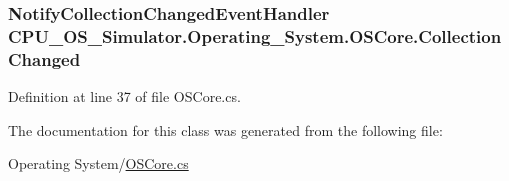 \subsubsection[{Collection\+Changed}]{\setlength{\rightskip}{0pt plus 5cm}Notify\+Collection\+Changed\+Event\+Handler C\+P\+U\+\_\+\+O\+S\+\_\+\+Simulator.\+Operating\+\_\+\+System.\+O\+S\+Core.\+Collection\+Changed}\label{class_c_p_u___o_s___simulator_1_1_operating___system_1_1_o_s_core_abcbb2efff8a4078fae3edb9b31f62198}


Definition at line 37 of file O\+S\+Core.\+cs.



The documentation for this class was generated from the following file\+:\begin{DoxyCompactItemize}
\item 
Operating System/\hyperlink{_o_s_core_8cs}{O\+S\+Core.\+cs}\end{DoxyCompactItemize}
